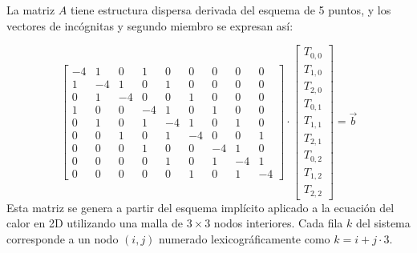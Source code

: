 \documentclass{article}
\begin{document}
La matriz $A$ tiene estructura dispersa derivada del esquema de 5 puntos, y los vectores de incógnitas y segundo miembro se expresan así:

$$
\begin{bmatrix}
-4 & 1 & 0 & 1 & 0 & 0 & 0 & 0 & 0 \\
1 & -4 & 1 & 0 & 1 & 0 & 0 & 0 & 0 \\
0 & 1 & -4 & 0 & 0 & 1 & 0 & 0 & 0 \\
1 & 0 & 0 & -4 & 1 & 0 & 1 & 0 & 0 \\
0 & 1 & 0 & 1 & -4 & 1 & 0 & 1 & 0 \\
0 & 0 & 1 & 0 & 1 & -4 & 0 & 0 & 1 \\
0 & 0 & 0 & 1 & 0 & 0 & -4 & 1 & 0 \\
0 & 0 & 0 & 0 & 1 & 0 & 1 & -4 & 1 \\
0 & 0 & 0 & 0 & 0 & 1 & 0 & 1 & -4
\end{bmatrix} \cdot
\begin{bmatrix}
T_{0,0} \\
T_{1,0} \\
T_{2,0} \\
T_{0,1} \\
T_{1,1} \\
T_{2,1} \\
T_{0,2} \\
T_{1,2} \\
T_{2,2}
\end{bmatrix} = 
\vec{b}
$$
Esta matriz se genera a partir del esquema implícito aplicado a la ecuación del calor en 2D utilizando una malla de $3 \times 3$ nodos interiores. Cada fila $k$ del sistema corresponde a un nodo $(i,j)$ numerado lexicográficamente como $k = i + j \cdot 3$.
\end{document}
